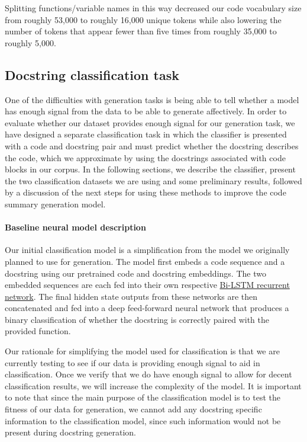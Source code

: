 \documentclass[article, 12pt, oneside]{memoir}
\begin{document}
Splitting functions/variable names in this way decreased our code
vocabulary size from roughly 53,000 to roughly 16,000 unique tokens
while also lowering the number of tokens that appear fewer than five
times from roughly 35,000 to roughly 5,000.

\hypertarget{docstring-classification-task}{%
\subsection{Docstring classification
task}\label{docstring-classification-task}}

One of the difficulties with generation tasks is being able to tell
whether a model has enough signal from the data to be able to
generate affectively.
In order to evaluate whether our dataset provides enough signal for our
generation task, we have designed a separate classification task in
which the classifier is presented with a code and docstring pair and
must predict whether the docstring describes the code, which we
approximate by using the docstrings associated with code blocks in our
corpus. In the following sections, we describe the classifier,
present the two classification datasets we are using and some
preliminary results, followed by a discussion of the next steps for using
these methods to improve the code summary generation model.

\hypertarget{baseline-neural-model-description}{%
\paragraph{Baseline neural model
description}\label{baseline-neural-model-description}}

Our initial classification model is a simplification from the model we
originally planned to use for generation. The model first embeds a code
sequence and a docstring using our pretrained code 
and docstring embeddings. The two embedded sequences
are each fed into their own respective
\href{https://pdfs.semanticscholar.org/4b80/89bc9b49f84de43acc2eb8900035f7d492b2.pdf}{Bi-LSTM
recurrent network}. The final hidden state outputs from these networks
are then concatenated and fed into a deep feed-forward neural network
that produces a binary classification of whether the docstring is
correctly paired with the provided function.

Our rationale for simplifying the model used for classification is that
we are currently testing to see if our data is providing enough signal
to aid in classification. Once we verify that we do have enough signal
to allow for decent classification results, we will increase the
complexity of the model. It is important to note that since the main purpose of the
classification model is to test the fitness of our data for generation,
we cannot add any docstring specific information to the classification
model, since such information would not be present during docstring
generation.
\end{document}
